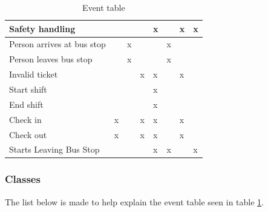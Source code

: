 \begin{table}[H]
{\begin{tabular}{|l|l|l|l|l|l|l|l|}
Safety handling            &           &                     &        & x          &          & x              & x   \\ \hline
Person arrives at bus stop &           & x                   &        &            & x        &                &     \\ \hline
Person leaves bus stop     &           & x                   &        &            & x        &                &     \\ \hline
Invalid ticket             &           &                     & x      & x          &          & x              &     \\ \hline
Start shift                &           &                     &        & x          &          &                &     \\ \hline
End shift                  &           &                     &        & x          &          &                &     \\ \hline
Check in                   & x         &                     & x      & x          &          & x              &     \\ \hline
Check out                  & x         &                     & x      & x          &          & x              &     \\ \hline
Starts Leaving Bus Stop            &           &                     &        & x          & x        &                & x   \\ \hline
\end{tabular}%
}
\label{event-table}
\caption{Event table}
\end{table}


\subsubsection{Classes}
The list below is made to help explain the event table seen in table \ref{event-table}.%

